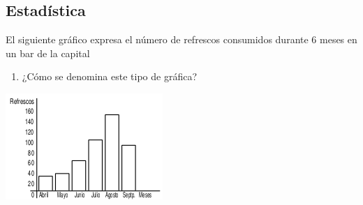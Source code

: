 \documentclass[10pt,twoside]{article}
\begin{document}
\begin{enumerate}
\section*{Estad\'{i}stica}
\begin{minipage}{.4\textwidth}
\item El siguiente gr\'{a}fico expresa el n\'{u}mero de refrescos consumidos durante 6 meses en un bar de la capital
\begin{enumerate}
\item ¿Cómo se denomina este tipo de gráfica?
\end{enumerate}
\end{minipage} \hfill
\begin{minipage}{.55\textwidth}
\includegraphics[scale=1]{Images/barras.png} 
\end{minipage}
\end{enumerate}
\end{document}
